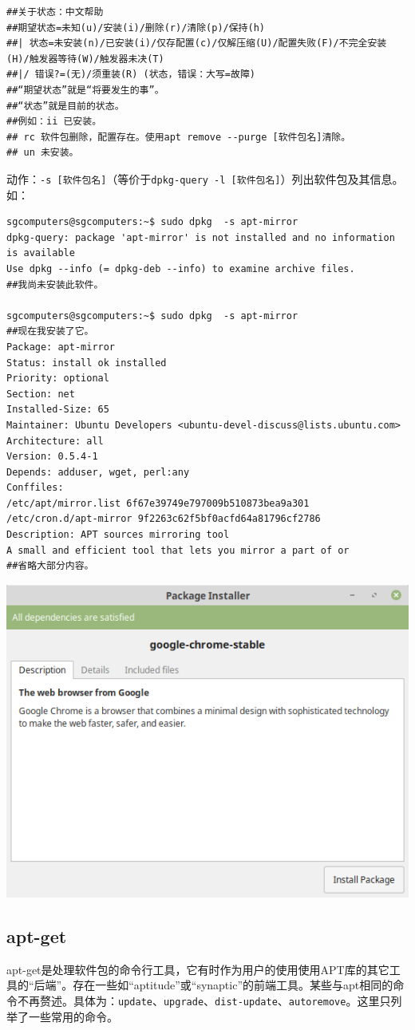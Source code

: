 \begin{verbatim}
##关于状态：中文帮助
##期望状态=未知(u)/安装(i)/删除(r)/清除(p)/保持(h)
##| 状态=未安装(n)/已安装(i)/仅存配置(c)/仅解压缩(U)/配置失败(F)/不完全安装(H)/触发器等待(W)/触发器未决(T)
##|/ 错误?=(无)/须重装(R) (状态，错误：大写=故障)
##“期望状态”就是“将要发生的事”。
##“状态”就是目前的状态。
##例如：ii 已安装。
## rc 软件包删除，配置存在。使用apt remove --purge [软件包名]清除。
## un 未安装。
\end{verbatim} \par

动作：\verb|-s [软件包名]|（等价于\verb|dpkg-query -l [软件包名]|）列出软件包及其信息。如：
\begin{verbatim}
sgcomputers@sgcomputers:~$ sudo dpkg  -s apt-mirror
dpkg-query: package 'apt-mirror' is not installed and no information is available
Use dpkg --info (= dpkg-deb --info) to examine archive files.
##我尚未安装此软件。

sgcomputers@sgcomputers:~$ sudo dpkg  -s apt-mirror
##现在我安装了它。
Package: apt-mirror
Status: install ok installed
Priority: optional
Section: net
Installed-Size: 65
Maintainer: Ubuntu Developers <ubuntu-devel-discuss@lists.ubuntu.com>
Architecture: all
Version: 0.5.4-1
Depends: adduser, wget, perl:any
Conffiles:
/etc/apt/mirror.list 6f67e39749e797009b510873bea9a301
/etc/cron.d/apt-mirror 9f2263c62f5bf0acfd64a81796cf2786
Description: APT sources mirroring tool
A small and efficient tool that lets you mirror a part of or
##省略大部分内容。
\end{verbatim}
\begin{center}
	\includegraphics[width=0.7\linewidth]{pic/gdebi.png}
\end{center}
\subsection{apt-get}
\cite{manaptget}\par
apt-get是处理软件包的命令行工具，它有时作为用户的使用使用APT库的其它工具的“后端”。存在一些如“aptitude”或“synaptic”的前端工具。某些与apt相同的命令不再赘述。具体为：\verb|update|、\verb|upgrade|、\verb|dist-update|、\verb|autoremove|。这里只列举了一些常用的命令。\par
